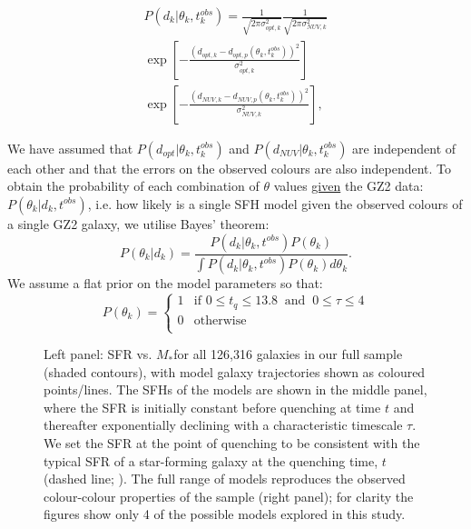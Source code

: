 \documentclass[useAMS,usenatbib]{mn2e}
\def\changed    {\color{titlecol} }
\begin{document}
\begin{multline}\label{like}
P(d_{k}|\theta_k, t^{obs}_{k}) = \frac{1}{\sqrt{2\pi\sigma_{opt, k}^2}}\frac{1}{\sqrt{2\pi\sigma_{NUV, k}^2}} \\ \exp{\left[ - \frac{(d_{opt, k} - d_{opt, p}(\theta_k, t_{k}^{obs}))^2}{\sigma_{opt, k}^2} \right]} \\ \exp{\left[ - \frac{(d_{NUV, k} - d_{NUV, p}(\theta_k, t_{k}^{obs}))^2}{\sigma_{NUV, k}^2} \right]},
\end{multline}


We have assumed that $P(d_{opt}|\theta_k, t^{obs}_{k})$ and $P(d_{NUV}|\theta_k, t^{obs}_{k})$ are independent of each other and that the errors on the observed colours are also independent. To obtain the probability of each combination of $\theta$ values \underline{given} the GZ2 data: $P(\theta_k|d_k, t^{obs})$, i.e. how likely is a single SFH model given the observed colours of a single GZ2 galaxy, {\changed we utilise Bayes' theorem}:
{\changed \begin{equation}\label{big}
P(\theta_k|d_k) = \frac{P(d_k|\theta_k, t^{obs})P(\theta_k)}{\int P(d_k |\theta_k, t^{obs})P(\theta_k) d\theta_k}.
\end{equation}}
{\changed We assume a flat prior on the model parameters so that:
\begin{equation}\label{prior}
P(\theta_k) =
\begin{cases}
1 & \text{if } 0 \leq t_q \leq 13.8 ~  \text{ and } ~ 0 \leq \tau \leq 4\\
0 & \text{otherwise} \\
\end{cases}
\end{equation}}

\begin{figure}
\caption{Left panel: SFR vs. $M_*$for all 126,316 galaxies in our full sample (shaded contours), with model galaxy trajectories shown as coloured points/lines. The SFHs of the models are shown in the middle panel, where the SFR is initially constant before quenching at time $t$ and thereafter exponentially declining with a characteristic timescale $\tau$. We set the SFR at the point of quenching to be consistent with the typical SFR of a star-forming galaxy at the quenching time, $t$ (dashed line; \citealt{Peng}). The full range of models reproduces the observed colour-colour properties of the sample (right panel); for clarity the figures show only 4 of the possible models explored in this study.}
\label{sfr_mass_col}
\end{figure}
\end{document}
